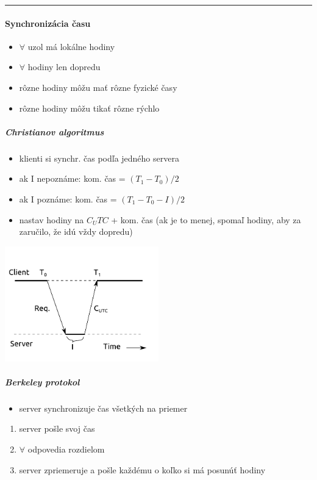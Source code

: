\documentclass[a4paper]{report}
\begin{document}
\hrule

\paragraph{Synchronizácia času}
\begin{itemize}
 \item $\forall$ uzol má lokálne hodiny
 \item $\forall$ hodiny len dopredu
 \item rôzne hodiny môžu mať rôzne fyzické časy
 \item rôzne hodiny môžu tikať rôzne rýchlo
\end{itemize}

\subparagraph{Christianov algoritmus}
\begin{itemize}
 \item klienti si synchr. čas podľa jedného servera
 \item ak I nepoznáme: kom. čas = $(T_1 - T_0) / 2$
 \item ak I poznáme: kom. čas = $(T_1 - T_0 - I) / 2$
 \item nastav hodiny na $C_UTC$ + kom. čas (ak je to menej, spomaľ hodiny, aby za zaručilo,
 že idú vždy dopredu)
\end{itemize}

\includegraphics[width=0.5\textwidth]{obrazky/christianov-protokol}

\subparagraph{Berkeley protokol}
\begin{itemize}
 \item server synchronizuje čas všetkých na priemer
\end{itemize}
\begin{enumerate}
 \item server pošle svoj čas
 \item $\forall$ odpovedia rozdielom
 \item server zpriemeruje a pošle každému o koľko si má posunúť hodiny
\end{enumerate}
\end{document}
